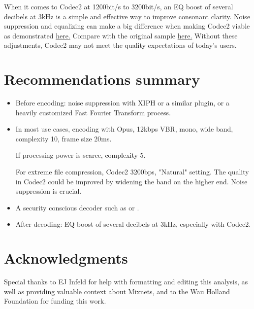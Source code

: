 \documentclass{article}
\begin{document}
When it comes to Codec2 at 1200bit/s to 3200bit/s, an EQ boost of several decibels at 3kHz is a simple and effective way to improve consonant clarity. Noise suppression and equalizing can make a big difference when making Codec2 viable as demonstrated \href{https://brettpreston.github.io/audio/KnPAudio/voice-denoize-codec2-3kHz-eq-boost.flac}{here.} Compare with the original sample \href{https://brettpreston.github.io/audio/KnPAudio/codec2/deep-voice-noise-3200.c2.flac}{here.} Without these adjustments, Codec2 may not meet the quality expectations of today's users.



\section{Recommendations summary}

\begin{itemize}
    \item Before encoding: noise suppression with XIPH or a similar plugin, or a heavily customized Fast Fourier Transform process.
    \item In most use cases, encoding with Opus, 12kbps VBR, mono, wide band, complexity 10, frame size 20ms.\smallskip

    If processing power is scarce, complexity 5.\smallskip

    For extreme file compression, Codec2 3200bps, "Natural" setting. The quality in Codec2 could be improved by widening the band on the higher end. Noise suppression is crucial.
    \item A security conscious decoder such as \cite{symphonia} or \cite{pion}.
    \item After decoding: EQ boost of several decibels at 3kHz, especially with Codec2.
\end{itemize}



\section*{Acknowledgments}
Special thanks to EJ Infeld for help with formatting and editing this analysis, as well as providing valuable context about Mixnets, and to the Wau Holland Foundation for funding this work.




\end{document}
